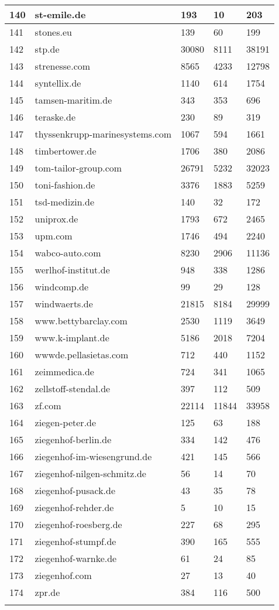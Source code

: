 \begin{longtable}{|m{0.5cm}|m{6cm}|m{2cm}|m{2cm}|m{2cm}|}
	\hline
	140 & st-emile.de & 193 & 10 & 203\\
	\hline
	141 & stones.eu & 139 & 60 & 199\\
	\hline
	142 & stp.de & 30080 & 8111 & 38191\\
	\hline
	143 & strenesse.com & 8565 & 4233 & 12798\\
	\hline
	144 & syntellix.de & 1140 & 614 & 1754\\
	\hline
	145 & tamsen-maritim.de & 343 & 353 & 696\\
	\hline
	146 & teraske.de & 230 & 89 & 319\\
	\hline
	147 & thyssenkrupp-marinesystems.com & 1067 & 594 & 1661\\
	\hline
	148 & timbertower.de & 1706 & 380 & 2086\\
	\hline
	149 & tom-tailor-group.com & 26791 & 5232 & 32023\\
	\hline
	150 & toni-fashion.de & 3376 & 1883 & 5259\\
	\hline
	151 & tsd-medizin.de & 140 & 32 & 172\\
	\hline
	152 & uniprox.de & 1793 & 672 & 2465\\
	\hline
	153 & upm.com & 1746 & 494 & 2240\\
	\hline
	154 & wabco-auto.com & 8230 & 2906 & 11136\\
	\hline
	155 & werlhof-institut.de & 948 & 338 & 1286\\
	\hline
	156 & windcomp.de & 99 & 29 & 128\\
	\hline
	157 & windwaerts.de & 21815 & 8184 & 29999\\
	\hline
	158 & www.bettybarclay.com & 2530 & 1119 & 3649\\
	\hline
	159 & www.k-implant.de & 5186 & 2018 & 7204\\
	\hline
	160 & wwwde.pellasietas.com & 712 & 440 & 1152\\
	\hline
	161 & zeimmedica.de & 724 & 341 & 1065\\
	\hline
	162 & zellstoff-stendal.de & 397 & 112 & 509\\
	\hline
	163 & zf.com & 22114 & 11844 & 33958\\
	\hline
	164 & ziegen-peter.de & 125 & 63 & 188\\
	\hline
	165 & ziegenhof-berlin.de & 334 & 142 & 476\\
	\hline
	166 & ziegenhof-im-wiesengrund.de & 421 & 145 & 566\\
	\hline
	167 & ziegenhof-nilgen-schmitz.de & 56 & 14 & 70\\
	\hline
	168 & ziegenhof-pusack.de & 43 & 35 & 78\\
	\hline
	169 & ziegenhof-rehder.de & 5 & 10 & 15\\
	\hline
	170 & ziegenhof-roesberg.de & 227 & 68 & 295\\
	\hline
	171 & ziegenhof-stumpf.de & 390 & 165 & 555\\
	\hline
	172 & ziegenhof-warnke.de & 61 & 24 & 85\\
	\hline
	173 & ziegenhof.com & 27 & 13 & 40\\
	\hline
	174 & zpr.de & 384 & 116 & 500\\
	\lasthline
\end{longtable}
%
